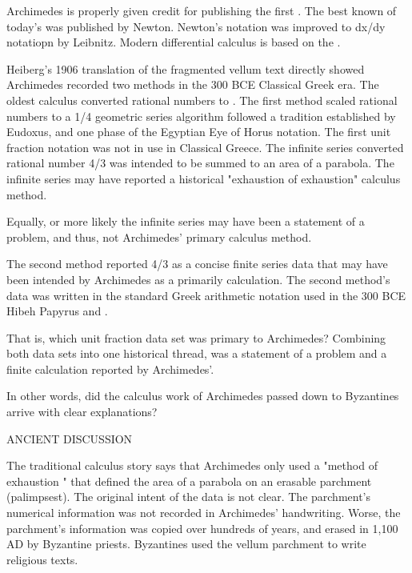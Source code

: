 \documentclass[12pt]{article}
\begin{document}
Archimedes is properly given credit for publishing the first . The best known of today's  was published by Newton. Newton's notation was improved to dx/dy notatiopn by Leibnitz. Modern differential calculus is based on the .

Heiberg's 1906 translation of the fragmented vellum text directly showed Archimedes recorded two methods in the 300 BCE Classical Greek era. The oldest calculus converted rational numbers to . The first method scaled rational numbers to a 1/4 geometric series algorithm followed a tradition established by Eudoxus, and one phase of the Egyptian Eye of Horus notation. The first unit fraction notation was not in use in Classical Greece. The infinite series converted rational number 4/3 was intended to be summed to an area of a parabola. The infinite series may have reported a historical "exhaustion of exhaustion" calculus method. 

Equally, or more likely the infinite series may have been a statement of a problem, and thus, not Archimedes' primary calculus method. 

The second method reported 4/3 as a concise finite series data that may have been intended by Archimedes as a primarily calculation. The second method's data was written in the standard Greek arithmetic notation used in the 300 BCE Hibeh Papyrus and .  

That is, which unit fraction data set was primary to Archimedes? Combining both data sets into one historical thread, was a statement of a problem and a finite calculation reported by Archimedes'. 

In other words, did the calculus work of Archimedes passed down to Byzantines arrive with clear explanations? 


ANCIENT DISCUSSION

The traditional calculus story says that Archimedes only used a "method of exhaustion " that defined the area of a parabola on an erasable parchment (palimpsest). The original intent of the data is not clear. The parchment's numerical information was not recorded in Archimedes' handwriting. Worse, the parchment's information was copied over hundreds of years, and erased in 1,100 AD by Byzantine priests. Byzantines used the vellum parchment to write religious texts. 
\end{document}
